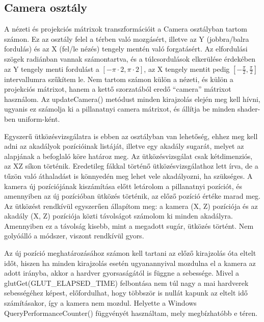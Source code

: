 \subsection{Camera osztály}
A nézeti és projekciós mátrixok transzformációit a Camera osztályban tartom számon. Ez az osztály felel a térben való mozgásért, illetve az Y (jobbra/balra fordulás) és az X (fel/le nézés) tengely mentén való forgatásért. 
Az elfordulási szögek radiánban vannak számontartva, és a túlcsordulások elkerülése érdekében az Y tengely menti fordulást a $[-\pi \cdot 2, \pi \cdot 2]$, az X tengely mentit pedig $[-\frac{\pi}{2}, \frac{\pi}{2}]$ intervallumra szűkítem le. Nem tartom számon külön a nézeti, és külön a projekciós mátrixot, hanem a kettő szorzatából eredő ``camera'' mátrixot használom. Az updateCamera() metódust minden kirajzolás elején meg kell hívni, ugyanis ez számolja ki a pillanatnyi camera mátrixot, és állítja be minden shader-ben uniform-ként. 

Egyszerű ütközésvizsgálatra is ebben az osztályban van lehetőség, ehhez meg kell adni az akadályok pozícióinak listáját, illetve egy akadály sugarát, melyet az alapjának a befoglaló köre határoz meg. Az ütközésvizsgálat csak kétdimenziós, az XZ síkon történik. Eredetileg fákkal történő ütközésvizsgálathoz lett írva, de a tűzön való áthaladást is könnyedén meg lehet vele akadályozni, ha szükséges. A kamera új pozíciójának kiszámítása előtt letárolom a pillanatnyi pozíciót, és amennyiben az új pozícióban ütközés történik, az előző pozíció értéke marad meg. Az ütközést rendkívül egyszerűen állapítom meg: a kamera (X, Z) pozíciója és az akadály (X, Z) pozíciója közti távolságot számolom ki minden akadályra. Amennyiben ez a távolság kisebb, mint a megadott sugár, ütközés történt. Nem golyóálló a módszer, viszont rendkívül gyors.

Az új pozíció meghatározásához számon kell tartani az előző kirajzolás óta eltelt időt, hiszen ha minden kirajzolás esetén ugyanannyival mozdulna el a kamera az adott irányba, akkor a hardver gyorsaságától is függne a sebessége. Mivel a glutGet(GLUT\_ELAPSED\_TIME) felbontása nem túl nagy a mai hardverek sebességéhez képest, előfordulhat, hogy többször is nullát kapunk az eltelt idő számításakor, így a kamera nem mozdul. Helyette a Windows QueryPerformanceCounter() függvényét használtam, mely megbízhatóbb e téren.

